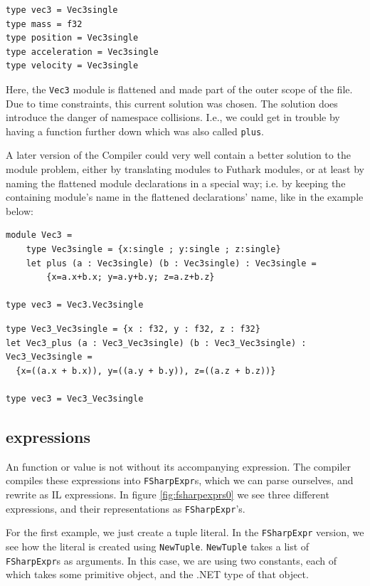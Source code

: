\begin{description}
\begin{lstlisting}[language=Futhark]
type vec3 = Vec3single
type mass = f32
type position = Vec3single
type acceleration = Vec3single
type velocity = Vec3single
\end{lstlisting}

  Here, the \texttt{Vec3} module is flattened
  and made part of the outer scope of the file. 
  Due to time constraints, this current solution was chosen.
  The solution does introduce the danger of namespace collisions. I.e.,
  we could get in trouble by having a function further down which was also called \texttt{plus}.

  A later version of the \fshark{}Compiler could very well contain a better
  solution to the module problem, either by translating \fshark{} modules to
  Futhark modules, or at least by naming the flattened module declarations in a
  special way; i.e. by keeping the containing module's name in the flattened
  declarations' name, like in the example below:
\end{description}

\begin{verbatim}
module Vec3 =
    type Vec3single = {x:single ; y:single ; z:single}
    let plus (a : Vec3single) (b : Vec3single) : Vec3single =
        {x=a.x+b.x; y=a.y+b.y; z=a.z+b.z}
            
type vec3 = Vec3.Vec3single
\end{verbatim}

\begin{lstlisting}[language=Futhark]
type Vec3_Vec3single = {x : f32, y : f32, z : f32}
let Vec3_plus (a : Vec3_Vec3single) (b : Vec3_Vec3single) : Vec3_Vec3single =
  {x=((a.x + b.x)), y=((a.y + b.y)), z=((a.z + b.z))}

type vec3 = Vec3_Vec3single
\end{lstlisting}



\subsection{\fsharp{} expressions}
\label{sec:fsharpexprs}
An \fsharp{} function or value is not without its accompanying \fsharp{}
expression. The \fsharp{} compiler compiles these \fsharp{} expressions into
\texttt{FSharpExpr}s, which we can parse ourselves, and rewrite as \fshark{}IL expressions.
In figure \ref{fig:fsharpexprs0} we see three different \fsharp{} expressions,
and their representations as \texttt{FSharpExpr}'s.

For the first example, we just create a tuple literal. In the
\texttt{FSharpExpr} version, we see how the literal is created using
\texttt{NewTuple}. \texttt{NewTuple} takes a list of \texttt{FSharpExpr}s as
arguments. In this case, we are using two constants, each of which takes some
primitive object, and the .NET type of that object.

